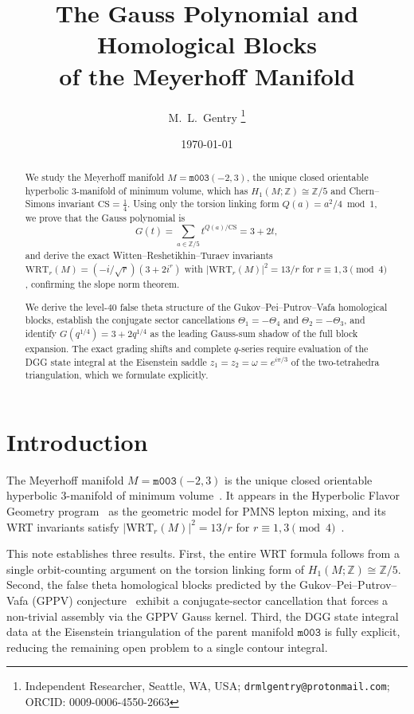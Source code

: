 \documentclass[11pt,a4paper]{article}
\theoremstyle{definition}
\theoremstyle{remark}
\newcommand{\Z}{\mathbb{Z}}
\newcommand{\CS}{\mathrm{CS}}
\newcommand{\WRT}{\mathrm{WRT}}
\newcommand{\mfld}[1]{\texttt{#1}}
\begin{document}
\title{The Gauss Polynomial and Homological Blocks\\
of the Meyerhoff Manifold}

\author{M.~L.~Gentry%
\thanks{Independent Researcher, Seattle, WA, USA;
\texttt{drmlgentry@protonmail.com};
ORCID: 0009-0006-4550-2663}}
\date{\today}
\maketitle

\begin{abstract}
We study the Meyerhoff manifold $M=\mfld{m003}(-2,3)$,
the unique closed orientable hyperbolic $3$-manifold of minimum volume,
which has $H_1(M;\Z)\cong\Z/5$ and Chern--Simons invariant $\CS=\tfrac14$.
Using only the torsion linking form $Q(a)=a^2/4\bmod1$, we prove that
the Gauss polynomial is
\[
G(t)=\sum_{a\in\Z/5}t^{Q(a)/\CS}=3+2t,
\]
and derive the exact Witten--Reshetikhin--Turaev invariants
$\WRT_r(M)=(-i/\sqrt{r})(3+2i^r)$
with $|\WRT_r(M)|^2=13/r$ for $r\equiv1,3\pmod4$,
confirming the slope norm theorem.

We derive the level-$40$ false theta structure of the
Gukov--Pei--Putrov--Vafa homological blocks, establish the conjugate
sector cancellations $\Theta_1=-\Theta_4$ and $\Theta_2=-\Theta_3$,
and identify $G(q^{1/4})=3+2q^{1/4}$ as the leading Gauss-sum shadow
of the full block expansion.
The exact grading shifts and complete $q$-series require evaluation
of the DGG state integral at the Eisenstein saddle
$z_1=z_2=\omega=e^{i\pi/3}$ of the two-tetrahedra triangulation,
which we formulate explicitly.
\end{abstract}

\section{Introduction}

The Meyerhoff manifold $M=\mfld{m003}(-2,3)$ is the unique closed
orientable hyperbolic $3$-manifold of minimum volume~\cite{GMM}.
It appears in the Hyperbolic Flavor Geometry program~\cite{GentryUnified}
as the geometric model for PMNS lepton mixing, and its WRT invariants
satisfy $|\WRT_r(M)|^2=13/r$ for $r\equiv1,3\pmod4$~\cite{GentryWRT}.

This note establishes three results.
First, the entire WRT formula follows from a single orbit-counting
argument on the torsion linking form of $H_1(M;\Z)\cong\Z/5$.
Second, the false theta homological blocks predicted by the
Gukov--Pei--Putrov--Vafa (GPPV) conjecture~\cite{GPPV} exhibit a
conjugate-sector cancellation that forces a non-trivial assembly
via the GPPV Gauss kernel.
Third, the DGG state integral data at the Eisenstein triangulation
of the parent manifold $\mfld{m003}$ is fully explicit, reducing
the remaining open problem to a single contour integral.
\end{document}
